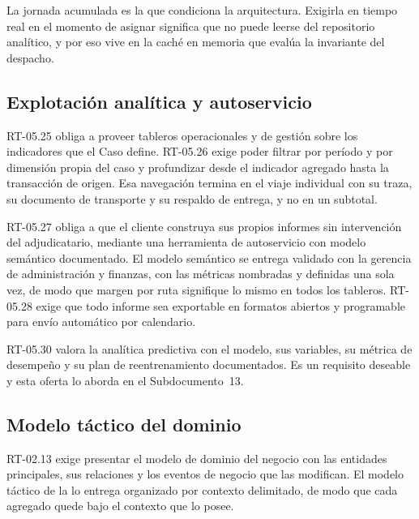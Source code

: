 La jornada acumulada es la que condiciona la arquitectura. Exigirla en tiempo real en el momento
de asignar significa que no puede leerse del repositorio analítico, y por eso vive en la caché en
memoria que evalúa la invariante del despacho.

\subsection{Explotación analítica y autoservicio}\label{sec:4-autoservicio}

RT-05.25 obliga a proveer tableros operacionales y de gestión sobre los indicadores que el Caso define.
RT-05.26 exige poder filtrar por período y por dimensión propia del caso y profundizar desde el
indicador agregado hasta la transacción de origen. Esa navegación termina en el viaje individual con su
traza, su documento de transporte y su respaldo de entrega, y no en un subtotal.

RT-05.27 obliga a que el cliente construya sus propios informes sin intervención del adjudicatario,
mediante una herramienta de autoservicio con modelo semántico documentado. El modelo semántico se
entrega validado con la gerencia de administración y finanzas, con las métricas nombradas y definidas
una sola vez, de modo que margen por ruta signifique lo mismo en todos los tableros. RT-05.28 exige que
todo informe sea exportable en formatos abiertos y programable para envío automático por calendario.

RT-05.30 valora la analítica predictiva con el modelo, sus variables, su métrica de desempeño y su plan
de reentrenamiento documentados. Es un requisito deseable y esta oferta lo aborda en el
Subdocumento~13.

\subsection{Modelo táctico del dominio}\label{sec:4-tactico}

RT-02.13 exige presentar el modelo de dominio del negocio con las entidades principales, sus relaciones
y los eventos de negocio que las modifican. El modelo táctico de la  lo entrega
organizado por contexto delimitado, de modo que cada agregado quede bajo el contexto que lo posee.

